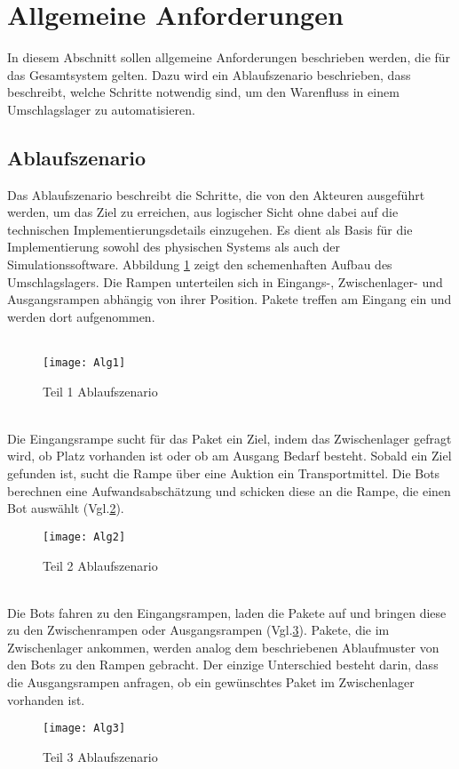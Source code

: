 \section{Allgemeine Anforderungen}
In diesem Abschnitt sollen allgemeine Anforderungen beschrieben werden, die für das Gesamtsystem gelten. Dazu wird ein Ablaufszenario beschrieben, dass beschreibt, welche Schritte notwendig sind, um den Warenfluss in einem Umschlagslager zu automatisieren.
\subsection{Ablaufszenario}\label{AL} 
Das Ablaufszenario beschreibt die Schritte, die von den Akteuren ausgeführt werden, um das Ziel zu erreichen, aus logischer Sicht ohne dabei auf die technischen Implementierungsdetails einzugehen. Es dient als Basis für die Implementierung sowohl des physischen Systems als auch der Simulationssoftware. Abbildung \ref{Abl1} zeigt den schemenhaften Aufbau des Umschlagslagers. Die Rampen unterteilen sich in Eingangs-, Zwischenlager- und Ausgangsrampen abhängig von ihrer Position. Pakete treffen am Eingang ein und werden dort aufgenommen. 
\\\\
\begin{figure}[h!]
	\centering
		\texttt{[image: Alg1]}        
		\caption{Teil 1 Ablaufszenario}
	\label{Abl1}
\end{figure}
\\
Die Eingangsrampe sucht für das Paket ein Ziel, indem das Zwischenlager gefragt wird, ob Platz vorhanden ist oder ob am Ausgang Bedarf besteht. Sobald ein Ziel gefunden ist, sucht die Rampe über eine Auktion ein Transportmittel. Die Bots berechnen eine Aufwandsabschätzung und schicken diese an die Rampe, die einen Bot auswählt (Vgl.\ref{Abl2}). 
\\   
\begin{figure}[h!]
	\centering
		\texttt{[image: Alg2]}        
		\caption{Teil 2 Ablaufszenario}
	\label{Abl2}
\end{figure} 
\\
Die Bots fahren zu den Eingangsrampen, laden die Pakete auf und bringen diese zu den Zwischenrampen oder Ausgangsrampen (Vgl.\ref{Abl3}). Pakete, die im Zwischenlager ankommen, werden analog dem beschriebenen Ablaufmuster von den Bots zu den Rampen gebracht. Der einzige Unterschied besteht darin, dass die Ausgangsrampen anfragen, ob ein gewünschtes Paket im Zwischenlager vorhanden ist.
\begin{figure}[h!]
	\centering
		\texttt{[image: Alg3]}        
		\caption{Teil 3 Ablaufszenario}
	\label{Abl3}
\end{figure}  
